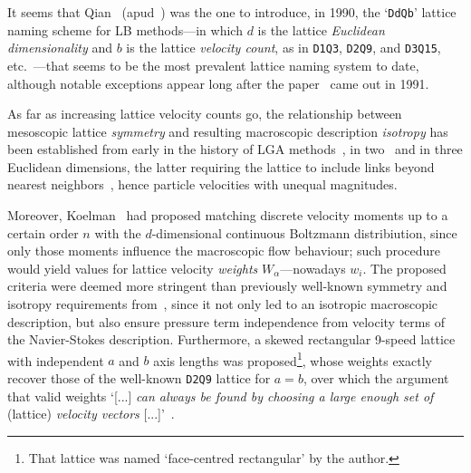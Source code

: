     It seems that Qian~\cite{1990-QianYH-Paris} (apud~\cite[p.~235]{1993-QianYH-JSciComput}) was the one to introduce, in  1990,
    the `\texttt{DdQb}' lattice naming scheme for LB methods---in which $d$ is the lattice \emph{Euclidean  dimensionality}  and
    $b$   is   the   lattice   \emph{velocity   count},   as    in    \texttt{D1Q3},    \texttt{D2Q9},    and    \texttt{D3Q15},
    etc.~\cite{1992-QianYH+LallemandP-EurophysLett}---that seems to be  the  most  prevalent  lattice  naming  system  to  date,
    although notable exceptions appear long after the paper~\cite{1991-QianYH+LallemandP-AdvKinTheoContMech} came out in 1991.

    As far as increasing lattice velocity counts go, the relationship between mesoscopic lattice \emph{symmetry}  and  resulting
    macroscopic   description   \emph{isotropy}   has   been   established    from    early    in    the    history    of    LGA
    methods~\cite{1973-HardyJ+PazzisO-JMathPhys, 1976-HardyJ+PomeauY-PhysRevA},  in  two~\cite{1986-FrischU+PomeauY-PhysRevLett}
    and  in  three  Euclidean   dimensions,   the   latter   requiring   the   lattice   to   include   links   beyond   nearest
    neighbors~\cite[pp.~473,490]{1986-WolframS-JStatPhys}, hence particle velocities with unequal magnitudes.

    Moreover, Koelman~\cite{1991-KoelmanJMVA-EurophysLett} had proposed matching discrete velocity moments up to a certain order
    $n$ with the $d$-dimensional continuous Boltzmann distribiution, since only those moments  influence  the  macroscopic  flow
    behaviour; such procedure would yield values for lattice velocity \emph{weights} $W_{\alpha}$---nowadays $w_i$. The proposed
    criteria   were   deemed   more   stringent   than   previously    well-known    symmetry    and    isotropy    requirements
    from~\cite{1986-WolframS-JStatPhys}, since it not only led to an isotropic macroscopic description, but also ensure pressure
    term independence from velocity terms of the Navier-Stokes description. Furthermore, a skewed  rectangular  9-speed  lattice
    with independent $a$ and $b$ axis lengths was proposed\footnote{That lattice was named  `face-centred  rectangular'  by  the
    author.}, whose weights exactly recover those of the well-known \texttt{D2Q9} lattice for $a = b$, over which  the  argument
    that valid weights `[...] \emph{can always be found by choosing a large enough set of} (lattice)  \emph{velocity  vectors\/}
    [...]'~\cite{1991-KoelmanJMVA-EurophysLett}.

